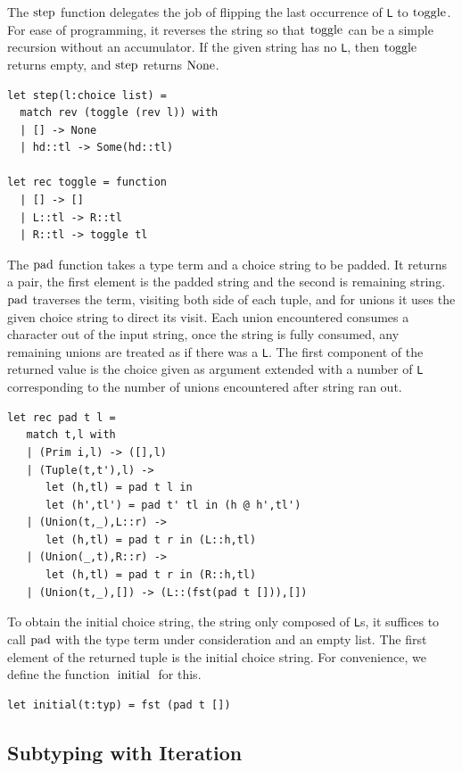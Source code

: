 \documentclass[a4paper,english]{lipics-v2019}
\renewcommand{\L}{{\tt L}\xspace}
\newcommand{\Ls}{{\tt L}s\xspace}
\renewcommand{\c}[1]{\ensuremath{\text{\lstinline{#1}}}\xspace}
\begin{document}
\noindent
The \c{step} function delegates the job of flipping the last occurrence of
\L to \c{toggle}. For ease of programming, it reverses the string so that
\c{toggle} can be a simple recursion without an accumulator.  If the given
string has no \L, then \c{toggle} returns empty, and \c{step} returns
\c{None}.
\newpage

\begin{lstlisting}
let step(l:choice list) =
  match rev (toggle (rev l)) with
  | [] -> None
  | hd::tl -> Some(hd::tl)

let rec toggle = function
  | [] -> []    
  | L::tl -> R::tl
  | R::tl -> toggle tl
\end{lstlisting}

\noindent
The \c{pad} function takes a type term and a choice string to be padded. It
returns a pair, the first element is the padded string and the second is
remaining string. \c{pad} traverses the term, visiting both side of each
tuple, and for unions it uses the given choice string to direct its visit.
Each union encountered consumes a character out of the input string, once
the string is fully consumed, any remaining unions are treated as if there
was a \L. The first component of the returned value is the choice given as
argument extended with a number of \L corresponding to the number of unions
encountered after string ran out.

\begin{lstlisting}
let rec pad t l =
   match t,l with
   | (Prim i,l) -> ([],l)
   | (Tuple(t,t'),l) -> 
      let (h,tl) = pad t l in
      let (h',tl') = pad t' tl in (h @ h',tl')
   | (Union(t,_),L::r) -> 
      let (h,tl) = pad t r in (L::h,tl)
   | (Union(_,t),R::r) -> 
      let (h,tl) = pad t r in (R::h,tl)
   | (Union(t,_),[]) -> (L::(fst(pad t [])),[])
\end{lstlisting}

\noindent
To obtain the initial choice string, the string only composed of \Ls, it
suffices to call \c{pad} with the type term under consideration and an empty
list. The first element of the returned tuple is the initial choice
string. For convenience, we define the function \c{initial} for this.

\begin{lstlisting}
let initial(t:typ) = fst (pad t [])
\end{lstlisting}

\subsection{Subtyping with Iteration}
\end{document}
